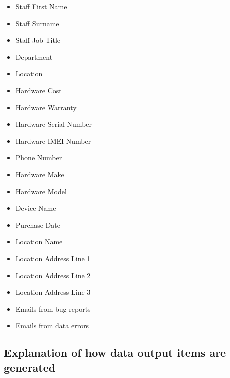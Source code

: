 \begin{itemize}
\item Staff First Name
\item Staff Surname
\item Staff Job Title
\item Department
\item Location
\item Hardware Cost
\item Hardware Warranty
\item Hardware Serial Number
\item Hardware IMEI Number
\item Phone Number
\item Hardware Make
\item Hardware Model
\item Device Name
\item Purchase Date
\item Location Name 
\item Location Address Line 1
\item Location Address Line 2
\item Location Address Line 3
\item Emails from bug reports
\item Emails from data errors
\end{itemize}

\subsection{Explanation of how data output items are generated}

